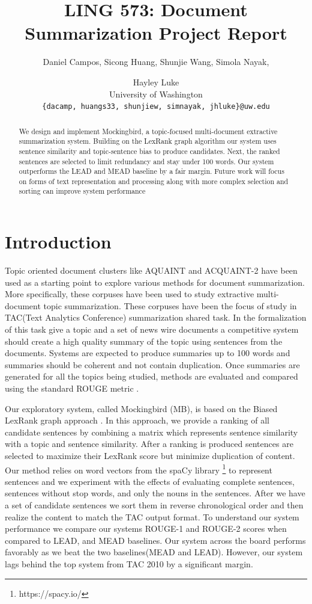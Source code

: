 \documentclass[11pt,a4paper]{article}
\title{LING 573: Document Summarization Project Report}
\author{Daniel Campos, Sicong Huang, Shunjie Wang, Simola Nayak, \and Hayley Luke \\ University of Washington \\ {\tt\{dacamp, huangs33, shunjiew, simnayak, jhluke\}@uw.edu}}
\begin{document}
\maketitle
\begin{abstract}
We design and implement Mockingbird, a topic-focused multi-document extractive summarization system. Building on the LexRank graph algorithm our system uses sentence similarity and topic-sentence bias to produce candidates. Next, the ranked sentences are selected to limit redundancy and stay under 100 words. Our system outperforms the LEAD and MEAD baseline by a fair margin. Future work will focus on forms of text representation and processing along with more complex selection and sorting can improve system performance
\end{abstract}
\section{Introduction}
Topic oriented document clusters like AQUAINT \cite{Graff2002TheAC} and ACQUAINT-2 have been used as a starting point to explore various methods for document summarization. More specifically, these corpuses have been used to study extractive multi-document topic summarization. These corpuses have been the focus of study in TAC(Text Analytics Conference) \cite{Dang2008OverviewOT} summarization shared task. In the formalization of this task give a topic and a set of news wire documents a competitive system should create a high quality summary of the topic using sentences from the documents. Systems are expected to produce summaries up to 100 words and summaries should be coherent and not contain duplication. Once summaries are generated for all the topics being studied, methods are evaluated and compared using the standard ROUGE metric \cite{Lin2004ROUGEAP}.

Our exploratory system, called Mockingbird (MB), is based on the Biased LexRank graph approach \cite{Otterbacher2009BiasedLP}. In this approach, we provide a ranking of all candidate sentences by combining a matrix which represents sentence similarity with a topic and sentence similarity. After a ranking is produced sentences are selected to maximize their LexRank score but minimize duplication of content. Our method relies on word vectors \cite{Mikolov2013DistributedRO} from the spaCy library \footnote{https://spacy.io/} to represent sentences and we experiment with the effects of evaluating complete sentences, sentences without stop words, and only the nouns in the sentences. After we have a set of candidate sentences we sort them in reverse chronological order and then realize the content to match the TAC output format. To understand our system performance we compare our systems ROUGE-1 and ROUGE-2 scores when compared to LEAD, and MEAD baselines. Our system across the board performs favorably as we beat the two baselines(MEAD and LEAD). However, our system lags behind the top system from TAC 2010 by a significant margin.
\end{document}
